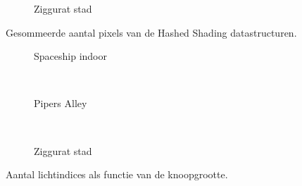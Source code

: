 \begin{figure}[t]
\begin{minipage}[t]{0.5\textwidth}
  \begin{adjustbox}{minipage=\textwidth, scale=0.55}
    \begin{subfigure}[b]{1.6\textwidth}
      \centering
      \def\svgwidth{\textwidth}
      
      \caption{Ziggurat stad}
      \label{fig:hs-sd-light-indices:city}
    \end{subfigure}
  \end{adjustbox}
  \caption{\small Gesommeerde aantal pixels van de Hashed Shading datastructuren.}
  \label{fig:hs-sd-light-indices}
  \end{minipage}%
  \begin{minipage}[t]{0.5\textwidth}
  \begin{adjustbox}{minipage=\textwidth, scale=0.55}
    \begin{subfigure}[b]{1.6\textwidth}
      \centering
      \def\svgwidth{\textwidth}
      
      \caption{Spaceship indoor}
      \vspace{4pt}
      \label{fig:hs-sd-exec:indoor}
    \end{subfigure}
  \end{adjustbox} \\
  \begin{adjustbox}{minipage=\textwidth, scale=0.55}
    \begin{subfigure}[b]{1.6\textwidth}
      \centering
      \def\svgwidth{\textwidth}
      
      \caption{Pipers Alley}
      \vspace{4pt}
      \label{fig:hs-sd-exec:alley}
    \end{subfigure}
  \end{adjustbox} \\
  \begin{adjustbox}{minipage=\textwidth, scale=0.55}
    \begin{subfigure}[b]{1.6\textwidth}
      \centering
      \def\svgwidth{\textwidth}
      
      \caption{Ziggurat stad}
      \label{fig:hs-sd-exec:city}
    \end{subfigure}
  \end{adjustbox}
  \caption{\small Aantal lichtindices als functie van de knoopgrootte.}
  \label{fig:hs-sd-exec}
  \end{minipage} 
\end{figure}

